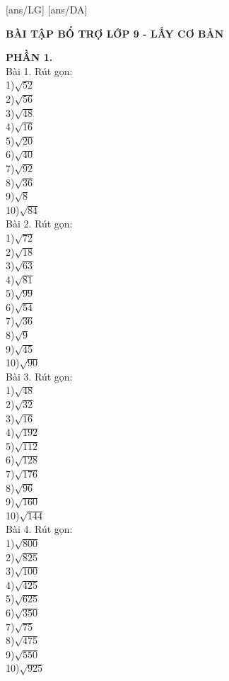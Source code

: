 \documentclass[12pt,a4paper]{article}
\begin{document}
	[ans/LG]
	[ans/DA]
	\pagestyle{fancy}
	\fancyhf{}
	\begin{center}
		{\bf\Large BÀI TẬP BỔ TRỢ LỚP 9 - LẤY CƠ BẢN}
	\end{center}
\textbf{PHẦN 1.}\\
Bài 1. Rút gọn:\\
1)$\sqrt{52}$\\
2)$\sqrt{56}$\\
3)$\sqrt{48}$\\
4)$\sqrt{16}$\\
5)$\sqrt{20}$\\
6)$\sqrt{40}$\\
7)$\sqrt{92}$\\
8)$\sqrt{36}$\\
9)$\sqrt{8}$\\
10)$\sqrt{84}$\\

Bài 2. Rút gọn:\\
1)$\sqrt{72}$\\
2)$\sqrt{18}$\\
3)$\sqrt{63}$\\
4)$\sqrt{81}$\\
5)$\sqrt{99}$\\
6)$\sqrt{54}$\\
7)$\sqrt{36}$\\
8)$\sqrt{9}$\\
9)$\sqrt{45}$\\
10)$\sqrt{90}$\\

Bài 3. Rút gọn:\\
1)$\sqrt{48}$\\
2)$\sqrt{32}$\\
3)$\sqrt{16}$\\
4)$\sqrt{192}$\\
5)$\sqrt{112}$\\
6)$\sqrt{128}$\\
7)$\sqrt{176}$\\
8)$\sqrt{96}$\\
9)$\sqrt{160}$\\
10)$\sqrt{144}$\\

Bài 4. Rút gọn:\\
1)$\sqrt{800}$\\
2)$\sqrt{825}$\\
3)$\sqrt{100}$\\
4)$\sqrt{425}$\\
5)$\sqrt{625}$\\
6)$\sqrt{350}$\\
7)$\sqrt{75}$\\
8)$\sqrt{475}$\\
9)$\sqrt{550}$\\
10)$\sqrt{925}$\\
\end{document}
